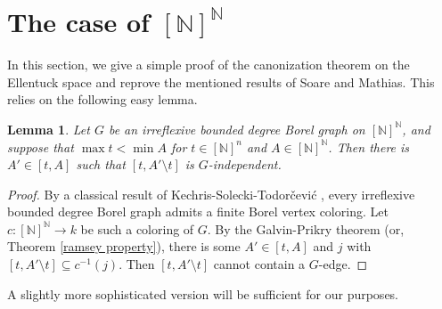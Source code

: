 \documentclass[11pt]{amsart}
\newcommand{\N}{\mathbb{N}}
\newtheorem{lemma}[theorem]{Lemma}
\theoremstyle{definition}
\numberwithin{equation}{section}
\begin{document}
    
	\section{The case of $[\N]^\N$}
	\label{s:ellentuck}
	In this section, we give a simple proof of the canonization theorem on the Ellentuck space and reprove the mentioned results of Soare and  Mathias. This relies on the following easy lemma. 
	
	\begin{lemma}
		\label{l:suslin} Let $G$ be an irreflexive bounded degree Borel graph on $[\N]^\N$, and suppose that $\max t<\min A$ for $t \in [\N]^n$ and $A\in [\N]^\N$. Then there is $A' \in [t,A]$ such that $[t,A'\setminus t]$ is $G$-independent. 
	\end{lemma}
	\begin{proof}
		By a classical result of Kechris-Solecki-Todor\v{c}evi\'c \cite{KST}, every irreflexive bounded degree Borel graph admits a finite Borel vertex coloring. Let $c:[\N]^\N \to k$ be such a coloring of $G$. By the Galvin-Prikry theorem (or, Theorem \ref{ramsey property}), there is some $A' \in [t, A]$ and $j$ with $[t,A'\setminus t] \subseteq c^{-1}(j)$. Then $[t,A'\setminus t]$ cannot contain a $G$-edge.
	\end{proof}
	
	A slightly more sophisticated version will be sufficient for our purposes. 
	
\end{document}
